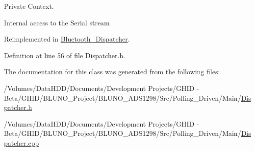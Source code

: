 \-Private \-Context. 

\-Internal access to the \-Serial stream 

\-Reimplemented in \hyperlink{class_bluetooth___dispatcher_a9b30fd1951f4e064a707ec75b941d18e}{\-Bluetooth\-\_\-\-Dispatcher}.



\-Definition at line 56 of file \-Dispatcher.\-h.



\-The documentation for this class was generated from the following files\-:\begin{DoxyCompactItemize}
\item 
/\-Volumes/\-Data\-H\-D\-D/\-Documents/\-Development Projects/\-G\-H\-I\-D -\/ Beta/\-G\-H\-I\-D/\-B\-L\-U\-N\-O\-\_\-\-Project/\-B\-L\-U\-N\-O\-\_\-\-A\-D\-S1298/\-Src/\-Polling\-\_\-\-Driven/\-Main/\hyperlink{_dispatcher_8h}{\-Dispatcher.\-h}\item 
/\-Volumes/\-Data\-H\-D\-D/\-Documents/\-Development Projects/\-G\-H\-I\-D -\/ Beta/\-G\-H\-I\-D/\-B\-L\-U\-N\-O\-\_\-\-Project/\-B\-L\-U\-N\-O\-\_\-\-A\-D\-S1298/\-Src/\-Polling\-\_\-\-Driven/\-Main/\hyperlink{_dispatcher_8cpp}{\-Dispatcher.\-cpp}\end{DoxyCompactItemize}
